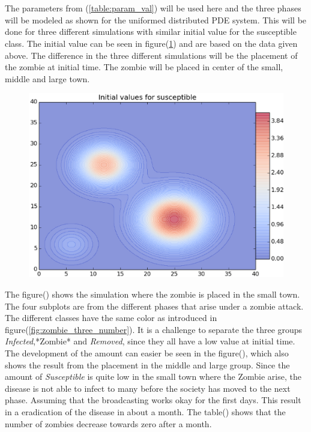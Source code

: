 \documentclass[%
twoside,                 %
final,                   %
10pt]{article}
\begin{document}
\noindent
\\
\\
The parameters from (\ref{table:param_val}) will be used here and the three phases will be modeled as shown for the uniformed distributed PDE system. This will be done for three different simulations with similar initial value for the susceptible class. The initial value can be seen in figure(\ref{fig:initial_value_susceptible}) and are based on the data given above. The difference in the three different simulations will be the placement of the zombie at initial time. The zombie will be placed in center of the small, middle and large town.


\begin{figure}[ht]
  \centerline{\includegraphics[width=0.8\linewidth]{plots/initial_value_susceptible.eps}}
  \caption{
  \label{fig:initial_value_susceptible}
  }
\end{figure}


The figure() shows the simulation where the zombie is placed in the small town. The four subplots are from the different phases that arise under a zombie attack. The different classes have the same color as introduced in figure(\ref{fig:zombie_three_number}). It is a challenge to separate the three groups \emph{Infected},*Zombie* and \emph{Removed}, since they all have a low value at initial time. The development of the amount can easier be seen in the figure(), which also shows the result from the placement in the middle and large group. Since the amount of \emph{Susceptible} is quite low in the small town where the Zombie arise, the disease is not able to infect to many before the society has moved to the next phase. Assuming that the broadcasting works okay for the first days. This result in a eradication of the disease in about a month. The table() shows that the number of zombies decrease towards zero after a month. 
\end{document}
